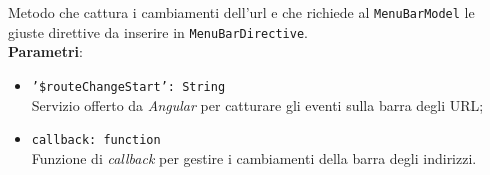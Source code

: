 \begin{itemize}
\begin{itemize}
		Metodo che cattura i cambiamenti dell'url e che richiede al \texttt{MenuBarModel} le giuste direttive da inserire in \texttt{MenuBarDirective}. \\
		\textbf{Parametri}:
		\begin{itemize}
			\item \texttt{'\$routeChangeStart': String}	\\ Servizio offerto da \textit{Angular} per catturare gli eventi sulla barra degli URL;
			\item \texttt{callback: function}	\\ Funzione di \textit{callback} per gestire i cambiamenti della barra degli indirizzi.
		\end{itemize}
	\end{itemize}
\end{itemize}


